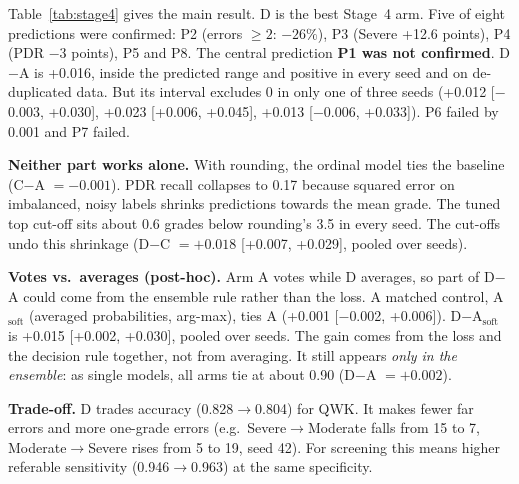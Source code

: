 \documentclass[conference]{IEEEtran}
\begin{document}
Table~\ref{tab:stage4} gives the main result. D is the best Stage~4 arm. Five of eight predictions were confirmed:
P2 (errors $\ge2$: $-26\%$), P3 (Severe +12.6 points), P4 (PDR $-3$ points), P5 and P8. The central prediction
\textbf{P1 was not confirmed}. D$-$A is +0.016, inside the predicted range and positive in every seed and on
de-duplicated data. But its interval excludes 0 in only one of three seeds
(+0.012 [$-$0.003, +0.030], +0.023 [+0.006, +0.045], +0.013 [$-$0.006, +0.033]). P6 failed by 0.001 and P7 failed.

\textbf{Neither part works alone.} With rounding, the ordinal model ties the baseline (C$-$A $=-0.001$). PDR recall
collapses to 0.17 because squared error on imbalanced, noisy labels shrinks predictions towards the mean grade. The
tuned top cut-off sits about 0.6 grades below rounding's 3.5 in every seed. The cut-offs undo this shrinkage
(D$-$C $=+0.018$ [+0.007, +0.029], pooled over seeds).

\textbf{Votes vs.\ averages (post-hoc).} Arm A votes while D averages, so part of D$-$A could come from the ensemble
rule rather than the loss. A matched control, A$_\text{soft}$ (averaged probabilities, arg-max), ties A
(+0.001 [$-$0.002, +0.006]). D$-$A$_\text{soft}$ is +0.015 [+0.002, +0.030], pooled over seeds. The gain comes from
the loss and the decision rule together, not from averaging. It still appears \emph{only in the ensemble}: as single
models, all arms tie at about 0.90 (D$-$A $=+0.002$).

\textbf{Trade-off.} D trades accuracy (0.828$\to$0.804) for QWK. It makes fewer far errors and more one-grade errors
(e.g.\ Severe$\to$Moderate falls from 15 to 7, Moderate$\to$Severe rises from 5 to 19, seed 42). For screening this
means higher referable sensitivity (0.946$\to$0.963) at the same specificity.

\end{document}
